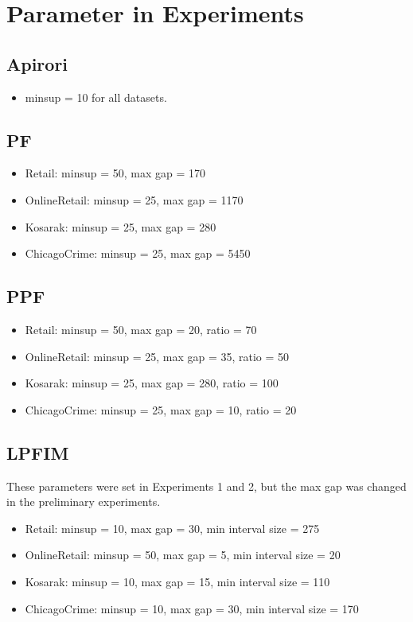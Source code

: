 \section{Parameter in Experiments}
\label{sec:params}
\subsection{Apirori}
\begin{itemize}
    \item minsup = 10 for all datasets.
\end{itemize}

\subsection{PF}
\begin{itemize}
  \item Retail: minsup = 50, max gap = 170
  \item OnlineRetail: minsup = 25, max gap = 1170
  \item Kosarak: minsup = 25, max gap = 280
  \item ChicagoCrime: minsup = 25, max gap = 5450
\end{itemize}

\subsection{PPF}
\begin{itemize}
  \item Retail: minsup = 50, max gap = 20, ratio = 70
  \item OnlineRetail: minsup = 25, max gap = 35, ratio = 50
  \item Kosarak: minsup = 25, max gap = 280, ratio = 100
  \item ChicagoCrime: minsup = 25, max gap = 10, ratio = 20
\end{itemize}

\subsection{LPFIM}
These parameters were set in Experiments 1 and 2, but the max gap was changed in the preliminary experiments.
\begin{itemize}
  \item Retail: minsup = 10, max gap = 30, min interval size = 275
  \item OnlineRetail: minsup = 50, max gap = 5,  min interval size = 20
  \item Kosarak: minsup = 10, max gap = 15, min interval size = 110
  \item ChicagoCrime: minsup = 10, max gap = 30, min interval size = 170
\end{itemize}

